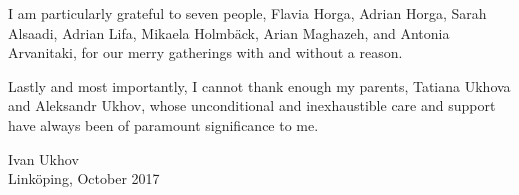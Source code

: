 I am particularly grateful to seven people, Flavia Horga, Adrian Horga, Sarah
Alsaadi, Adrian Lifa, Mikaela Holmbäck, Arian Maghazeh, and Antonia Arvanitaki,
for our merry gatherings with and without a reason.

Lastly and most importantly, I cannot thank enough my parents, Tatiana Ukhova
and Aleksandr Ukhov, whose unconditional and inexhaustible care and support have
always been of paramount significance to me.

\vspace{4em}
\hfill
\begin{minipage}{0.35\textwidth}
Ivan Ukhov\\
Linköping, October 2017
\end{minipage}
